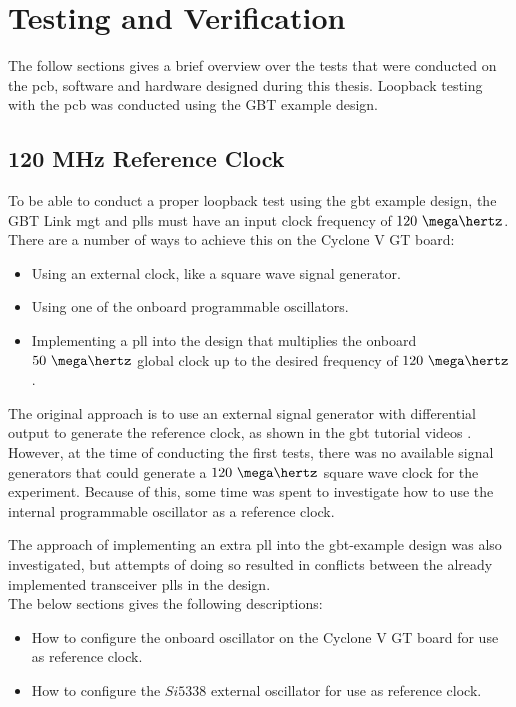 \documentclass[main.tex]{subfiles}
\begin{document}
\chapter{Testing and Verification} \label{chap:tests}

The follow sections gives a brief overview over the tests that were conducted on the \gls{pcb}, software and hardware designed during this thesis. Loopback testing with the \gls{pcb} was conducted using the GBT example design.

\section{120 MHz Reference Clock}


To be able to conduct a proper loopback test using the \gls{gbt} example design, the GBT Link \gls{mgt} and \glspl{pll} must have an input clock frequency of $120~\mega\hertz$. There are a number of ways to achieve this on the Cyclone V GT board: 
\begin{itemize}\setlength{\itemsep}{10pt}
\item Using an external clock, like a square wave signal generator.
\item Using one of the onboard programmable oscillators.
\item Implementing a \gls{pll} into the design that multiplies the onboard $50~\mega\hertz$ global clock up to the desired frequency of $120~\mega\hertz$.\\
\end{itemize}

The original approach is to use an external signal generator with differential output to generate the reference clock, as shown in the \gls{gbt} tutorial videos \cite{gbt_videos}. However, at the time of conducting the first tests, there was no available signal generators that could generate a $120~\mega\hertz$ square wave clock for the experiment. Because of this, some time was spent to investigate how to use the internal programmable oscillator as a reference clock.

The approach of implementing an extra \gls{pll} into the \gls{gbt}-example design was also investigated, but attempts of doing so resulted in conflicts between the already implemented transceiver \glspl{pll} in the design. \\

The below sections gives the following descriptions:
\begin{itemize}\setlength{\itemsep}{10pt}
\item How to configure the onboard oscillator on the Cyclone V GT board for use as reference clock. 
\item How to configure the $Si5338$ external oscillator for use as reference clock.
\end{itemize}
\end{document}
